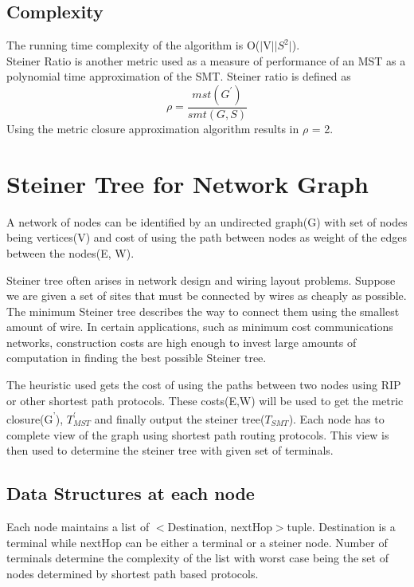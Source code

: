\documentclass[a4paper]{article}
\begin{document}
\subsection{Complexity}
The running time complexity of the algorithm is O($\vert$V$\vert$$\vert$$S^2$$\vert$). \\
Steiner Ratio is another metric used as a measure of performance of an MST as a polynomial time approximation of the SMT. Steiner ratio is defined as
\begin{equation}
							\rho = \frac{mst(G^{'})}{smt(G, S)}
\end{equation}
Using the metric closure approximation algorithm results in $\rho$ = 2.
\section{Steiner Tree for Network Graph}
A network of nodes can be identified by an undirected graph(G) with set of nodes being vertices(V) and cost of using the path between nodes as weight of the edges between the nodes(E, W).  \par
Steiner tree often arises in network design and wiring layout problems.     Suppose we are given a set of sites that must be connected by wires as cheaply as possible. The minimum Steiner tree describes the way to connect them using the smallest amount of wire. In certain applications, such as minimum cost communications networks, construction costs are high enough to invest large amounts of computation in finding the best possible Steiner tree.\par
The heuristic used gets the cost of using the paths between two nodes using RIP or other shortest path protocols. These costs(E,W) will be used to get the metric closure(G\textsuperscript{'}), $T^{'}_{MST}$ and finally output the steiner tree($T_{SMT}$). Each node has to complete view of the graph using shortest path routing protocols. This view is then used to determine the steiner tree with given set of terminals.\par
\subsection{Data Structures at each node}
Each node maintains a list of {$<$Destination, nextHop$>$}tuple. {Destination} is a terminal while {nextHop} can be either a terminal or a steiner node. Number of terminals determine the complexity of the list with worst case being the set of nodes determined by shortest path based protocols.
\end{document}
